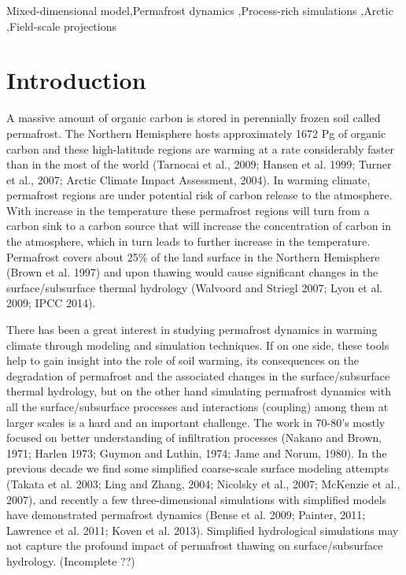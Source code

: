 \documentclass[review]{elsarticle}
\begin{document}
\begin{frontmatter}
\begin{abstract}
\end{abstract}
\begin{keyword}
Mixed-dimensional model\sep Permafrost dynamics  \sep Process-rich simulations \sep Arctic   \sep Field-scale projections  
\end{keyword}

\end{frontmatter}

\linenumbers

\section{Introduction}
A massive amount of organic carbon is stored in perennially frozen soil called permafrost. The Northern Hemisphere hosts approximately 1672 Pg of organic carbon and these high-latitude regions are warming at a rate considerably faster than in the most of the world (Tarnocai et al., 2009; Hansen et al. 1999; Turner et al., 2007; Arctic Climate Impact Assessment, 2004). In warming climate, permafrost regions are under potential risk of carbon release to the atmosphere. With increase in the temperature these permafrost regions will turn from a carbon sink to a carbon source that will increase the concentration of carbon in the atmosphere, which in turn leads to further increase in the temperature. Permafrost covers about 25\% of the land surface in the Northern Hemisphere (Brown et al. 1997) and upon thawing would cause significant changes in the surface/subsurface thermal hydrology (Walvoord and Striegl 2007; Lyon et al. 2009; IPCC 2014).

There has been a great interest in studying permafrost dynamics in warming climate through modeling and simulation techniques. If on one side, these tools help to gain insight into the role of soil warming, its consequences on the degradation of permafrost and the associated changes in the surface/subsurface thermal hydrology, but on the other hand simulating permafrost dynamics with all the surface/subsurface processes and interactions (coupling) among them at larger scales is a hard and an important challenge. The work in 70-80's mostly focused on better understanding of infiltration processes (Nakano and Brown, 1971; Harlen 1973; Guymon and Luthin, 1974; Jame and Norum, 1980). In the previous decade we find some simplified coarse-scale surface modeling attempts (Takata et al. 2003; Ling and Zhang, 2004; Nicolsky et al., 2007; McKenzie et al., 2007), and recently a few three-dimensional simulations with simplified models have demonstrated permafrost dynamics (Bense et al. 2009; Painter, 2011; Lawrence et al. 2011; Koven et al. 2013). Simplified hydrological simulations may not capture the profound impact of permafrost thawing on surface/subsurface hydrology. (Incomplete ??)
\end{document}
